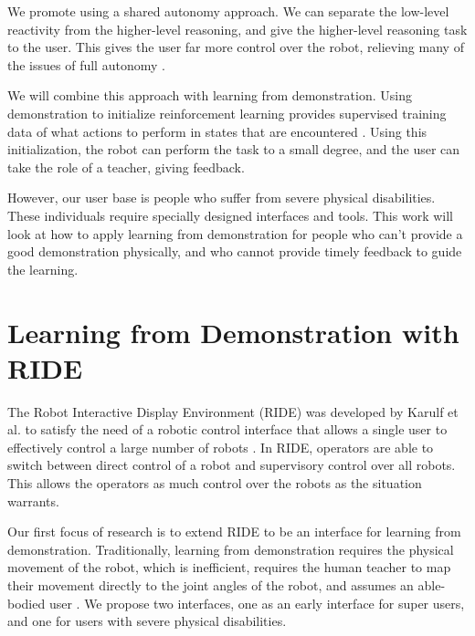\documentclass{acm_proc_article-sp}
\begin{document}

We promote using a shared autonomy approach. We can separate the low-level reactivity from the higher-level reasoning, and give the higher-level reasoning task to the user. This gives the user far more control over the robot, relieving many of the issues of full autonomy \cite{Goodrich:2007:HIS:1348099.1348100}.

We will combine this approach with learning from demonstration. Using demonstration to initialize reinforcement learning provides supervised training data of what actions to perform in states that are encountered \cite{Bagnell_2013_7451}. Using this initialization, the robot can perform the task to a small degree, and the user can take the role of a teacher, giving feedback.

However, our user base is people who suffer from severe physical disabilities. These individuals require specially designed interfaces and tools. This work will look at how to apply learning from demonstration for people who can't provide a good demonstration physically, and who cannot provide timely feedback to guide the learning.

\section{Learning from Demonstration with RIDE}
\label{Learning by Demonstration}
The Robot Interactive Display Environment (RIDE) was developed by Karulf et al. to satisfy the need of a robotic control interface that allows a single user to effectively control a large number of robots \cite{hri11c}. In RIDE, operators are able to switch between direct control of a robot and supervisory control over all robots. This allows the operators as much control over the robots as the situation warrants.

Our first focus of research is to extend RIDE to be an interface for learning from demonstration.  Traditionally, learning from demonstration requires the physical movement of the robot, which is inefficient, requires the human teacher to map their movement directly to the joint angles of the robot, and assumes an able-bodied user \cite{Bagnell_2013_7451}. We propose two interfaces, one as an early interface for super users, and one for users with severe physical disabilities. 
\end{document}
